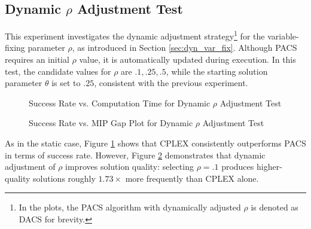 \subsection{Dynamic $\rho$ Adjustment Test}\label{sec:test_dyn_rho}
This experiment investigates the dynamic adjustment strategy\footnote{In the plots, the PACS algorithm with dynamically adjusted $\rho$ is denoted as DACS for brevity.} for the variable-fixing parameter $\rho$, as introduced in Section \ref{sec:dyn_var_fix}. Although PACS requires an initial $\rho$ value, it is automatically updated during execution. In this test, the candidate values for $\rho$ are ${.1, .25, .5}$, while the starting solution parameter $\theta$ is set to $.25$, consistent with the previous experiment.
\begin{figure}[H]
\centering
\begin{minipage}{0.6\columnwidth}
\centering
\resizebox{\linewidth}{!}{}
\end{minipage}%
\hfill
\begin{minipage}{0.4\columnwidth}
\centering
\resizebox{\linewidth}{!}{}
\end{minipage}
\caption{Success Rate vs. Computation Time for Dynamic $\rho$ Adjustment Test}
\label{fig:PACS_DYN_SuccRate}
\end{figure}

\begin{figure}[H]
\centering
\begin{minipage}{0.6\columnwidth}
\centering
\resizebox{\linewidth}{!}{}
\end{minipage}%
\hfill
\begin{minipage}{0.4\columnwidth}
\centering
\resizebox{\linewidth}{!}{}
\end{minipage}
\caption{Success Rate vs. MIP Gap Plot for Dynamic $\rho$ Adjustment Test}
\label{fig:PACS_DYN_MGAP}
\end{figure}

As in the static case, Figure \ref{fig:PACS_DYN_SuccRate} shows that CPLEX consistently outperforms PACS in terms of success rate. However, Figure \ref{fig:PACS_DYN_MGAP} demonstrates that dynamic adjustment of $\rho$ improves solution quality: selecting $\rho = .1$ produces higher-quality solutions roughly $1.73\times$ more frequently than CPLEX alone.


